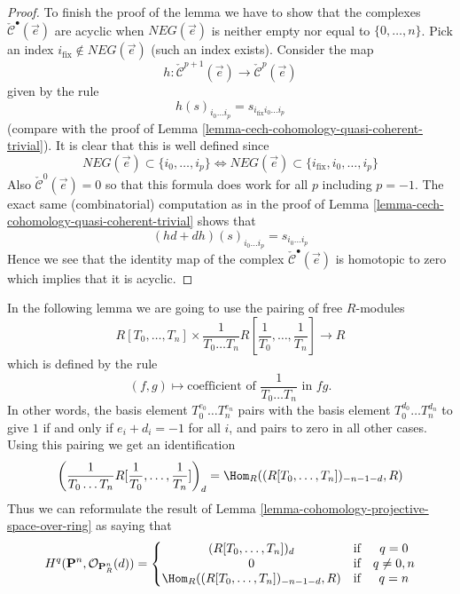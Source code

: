 \begin{proof}
\medskip\noindent
To finish the proof of the lemma we have to show that the complexes
$\check{\mathcal{C}}^\bullet(\vec{e})$ are acyclic when
$NEG(\vec{e})$ is neither empty nor equal to $\{0, \ldots, n\}$.
Pick an index $i_{\text{fix}} \not \in NEG(\vec{e})$ (such an index exists).
Consider the map
$$
h :
\check{\mathcal{C}}^{p + 1}(\vec{e})
\to
\check{\mathcal{C}}^p(\vec{e})
$$
given by the rule
$$
h(s)_{i_0 \ldots i_p} = s_{i_{\text{fix}} i_0 \ldots i_p}
$$
(compare with the proof of
Lemma \ref{lemma-cech-cohomology-quasi-coherent-trivial}).
It is clear that this is well defined since
$$
NEG(\vec{e}) \subset \{i_0, \ldots, i_p\}
\Leftrightarrow
NEG(\vec{e}) \subset \{i_{\text{fix}}, i_0, \ldots, i_p\}
$$
Also $\check{\mathcal{C}}^0(\vec{e}) = 0$ so that this
formula does work for all $p$ including $p = - 1$.
The exact same (combinatorial) computation as in the
proof of Lemma \ref{lemma-cech-cohomology-quasi-coherent-trivial}
shows that
$$
(hd + dh)(s)_{i_0 \ldots i_p}
=
s_{i_0 \ldots i_p}
$$
Hence we see that the identity map of the complex
$\check{\mathcal{C}}^\bullet(\vec{e})$ is homotopic to zero
which implies that it is acyclic.
\end{proof}

\noindent
In the following lemma we are going to use the pairing of free
$R$-modules
$$
R[T_0, \ldots, T_n]
\times
\frac{1}{T_0 \ldots T_n} R[\frac{1}{T_0}, \ldots, \frac{1}{T_n}]
\longrightarrow
R
$$
which is defined by the rule
$$
(f, g)
\longmapsto
\text{coefficient of }
\frac{1}{T_0 \ldots T_n}
\text{ in }fg.
$$
In other words, the basis element $T_0^{e_0} \ldots T_n^{e_n}$ pairs
with the basis element $T_0^{d_0} \ldots T_n^{d_n}$ to give $1$ if and only
if $e_i + d_i = -1$ for all $i$, and pairs to zero in all other cases.
Using this pairing we get an identification
$$
\left(\frac{1}{T_0 \ldots T_n} R[\frac{1}{T_0}, \ldots, \frac{1}{T_n}]\right)_d
=
\Hom_R((R[T_0, \ldots, T_n])_{-n - 1 - d}, R)
$$
Thus we can reformulate the result of
Lemma \ref{lemma-cohomology-projective-space-over-ring} as saying that
\begin{equation}
\label{equation-identify}
H^q(\mathbf{P}^n, \mathcal{O}_{\mathbf{P}^n_R}(d)) =
\left\{
\begin{matrix}
(R[T_0, \ldots, T_n])_d & \text{if} & q = 0 \\
0 & \text{if} & q \not = 0, n \\
\Hom_R((R[T_0, \ldots, T_n])_{-n - 1 - d}, R)
& \text{if} & q = n
\end{matrix}
\right.
\end{equation}


